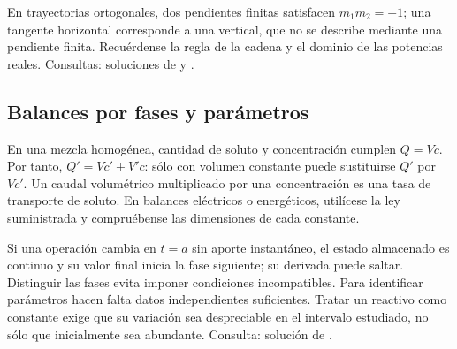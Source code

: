 En trayectorias ortogonales, dos pendientes finitas satisfacen
$m_1m_2=-1$; una tangente horizontal corresponde a una vertical, que no se
describe mediante una pendiente finita. Recuérdense la regla de la cadena
y el dominio de las potencias reales. Consultas: soluciones de
 y .

%
\subsection*{Balances por fases y parámetros}
\label{CH02-B04}
En una mezcla homogénea, cantidad de soluto y concentración cumplen
$Q=Vc$. Por tanto, $Q'=Vc'+V'c$: sólo con volumen constante puede
sustituirse $Q'$ por $Vc'$. Un caudal volumétrico multiplicado por una
concentración es una tasa de transporte de soluto. En balances eléctricos
o energéticos, utilícese la ley suministrada y compruébense las dimensiones
de cada constante.

Si una operación cambia en $t=a$ sin aporte instantáneo, el estado
almacenado es continuo y su valor final inicia la fase siguiente; su
derivada puede saltar. Distinguir las fases evita imponer condiciones
incompatibles. Para identificar parámetros hacen falta datos
independientes suficientes. Tratar un reactivo como constante exige que
su variación sea despreciable en el intervalo estudiado, no sólo que
inicialmente sea abundante. Consulta: solución de .
